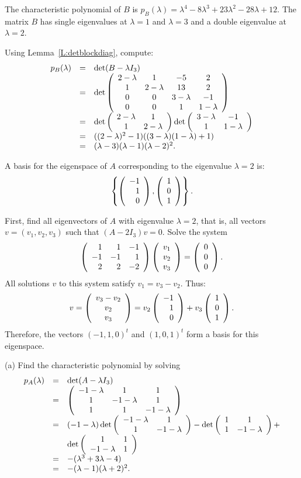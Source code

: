 \ans The characteristic polynomial of $B$ is $p_B(\lambda) = \lambda^4
- 8\lambda^3 + 23\lambda^2 - 28\lambda + 12$.  The matrix $B$ has single
eigenvalues at $\lambda = 1$ and $\lambda = 3$ and a double eigenvalue at
$\lambda = 2$.

\soln Using Lemma~\ref{L:detblockdiag},
compute:
\[
\begin{array}{rcl}
p_B(\lambda) & = & \det(B - \lambda I_3) \\
& = & \det\left(\begin{array}{cccc}
2 - \lambda & 1 & -5 & 2 \\
1 & 2 - \lambda & 13 & 2 \\
0 & 0 & 3 - \lambda & -1 \\
0 & 0 & 1 & 1 - \lambda \end{array}\right) \\
& = & \det\left(\begin{array}{cc} 2 - \lambda & 1\\ 1 &2 - \lambda\end{array}\right)
\det\left(\begin{array}{cc} 3 - \lambda & -1\\ 1 &1 - \lambda\end{array}\right) \\
& = & ((2 - \lambda)^2 - 1)((3 - \lambda)(1 - \lambda) + 1) \\
& = & (\lambda - 3)(\lambda - 1)(\lambda - 2)^2.
\end{array}
\]

\ans A basis for the eigenspace of $A$ corresponding to the eigenvalue
$\lambda = 2$ is:
\[
\left\{\left(\begin{array}{r} -1 \\ 1 \\ 0\end{array}\right), \left(\begin{array}{r} 1 \\ 0 \\ 1\end{array}\right)\right\}.
\]

\soln First, find all eigenvectors of $A$ with eigenvalue
$\lambda = 2$, that is, all vectors $v = (v_1,v_2,v_3)$ such
that $(A - 2I_3)v = 0$.  Solve the system
\[
\left(\begin{array}{rrr} 1 & 1 & -1 \\ -1 & -1 & 1 \\ 2 & 2 & -2\end{array}\right)\left(\begin{array}{r} v_1 \\ v_2 \\ v_3\end{array}\right) =
\left(\begin{array}{r} 0 \\ 0 \\ 0\end{array}\right).
\]
All solutions $v$ to this system satisfy $v_1 = v_3 - v_2$.  Thus:
\[
v = \left(\begin{array}{c} v_3 - v_2 \\ v_2 \\ v_3\end{array}\right) = v_2\left(\begin{array}{r} -1 \\ 1 \\ 0\end{array}\right) +
v_3\left(\begin{array}{r} 1 \\ 0 \\ 1\end{array}\right).
\]
Therefore, the vectors $(-1,1,0)^t$ and $(1,0,1)^t$ form a basis
for this eigenspace.

(a) Find the characteristic polynomial by solving
\[
\begin{array}{rcl}
p_A(\lambda) & = & \det(A - \lambda I_3) \\
& = & \left(\begin{array}{ccc} -1 - \lambda & 1 & 1 \\ 1 & -1 - \lambda & 1 \\ 1 & 1 & -1 - \lambda\end{array}\right) \\
& = & (-1 - \lambda)\det\left(\begin{array}{cc} -1 - \lambda & 1\\ 1 &-1 - \lambda\end{array}\right)
- \det\left(\begin{array}{cc} 1 & 1\\ 1 &-1 - \lambda\end{array}\right) + \\
& & \det\left(\begin{array}{cc} 1 & 1\\ -1 - \lambda &1\end{array}\right) \\
& = & -(\lambda^3 + 3\lambda - 4) \\
& = & -(\lambda - 1)(\lambda + 2)^2. \end{array}
\]

